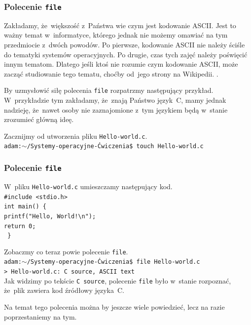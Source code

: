 \documentclass[10pt,t]{beamer}
\begin{document}
\begin{frame}
  \frametitle{Polecenie \texttt{file}}


  Zakładamy, że~większość z~Państwa wie czym jest kodowanie ASCII. Jest to
  ważny temat w~informatyce, którego jednak nie możemy omawiać na tym
  przedmiocie z~dwóch powodów. Po pierwsze, kodowanie ASCII nie należy
  ściśle do tematyki systemów operacyjnych. Po drugie, czas tych zajęć
  należy poświęcić innym tematom. Dlatego jeśli ktoś nie rozumie czym
  kodowanie ASCII, może zacząć studiowanie tego tematu, choćby od~jego
  strony na Wikipedii.
  .

  By uzmysłowić siłę polecenia \texttt{file} rozpatrzmy następujący
  przykład. W~przykładzie tym zakładamy, że~znają Państwo język~C, mamy
  jednak nadzieję, że~nawet osoby nie zaznajomione z~tym językiem będą
  w~stanie zrozumieć główną ideę.

  Zacznijmy od utworzenia pliku \texttt{Hello-world.c}. \\
  \texttt{adam:$\sim$/Systemy-operacyjne-Ćwiczenia\$ touch Hello-world.c} \\

\end{frame}





\begin{frame}
  \frametitle{Polecenie \texttt{file}}


  W~pliku \texttt{Hello-world.c} umieszczamy następujący kod. \\
  \texttt{\#include <stdio.h>} \\

  \texttt{int main() \{ } \\
  \hphantom{aaaa} \texttt{printf("Hello, World!\textbackslash n");} \\

  \hphantom{aaaa} \texttt{return 0;} \\
  \texttt{ \} }

  Zobaczmy co teraz powie polecenie \texttt{file}. \\
  \texttt{adam:$\sim$/Systemy-operacyjne-Ćwiczenia\$ file Hello-world.c} \\
  \texttt{> Hello-world.c: C source, ASCII text} \\
  Jak widzimy po tekście \texttt{C~source}, polecenie \texttt{file} było
  w~stanie rozpoznać, że~plik zawiera kod źródłowy języka~C.

  Na temat tego polecenia można by jeszcze wiele powiedzieć, lecz na razie
  poprzestaniemy na tym.

\end{frame}
\end{document}
